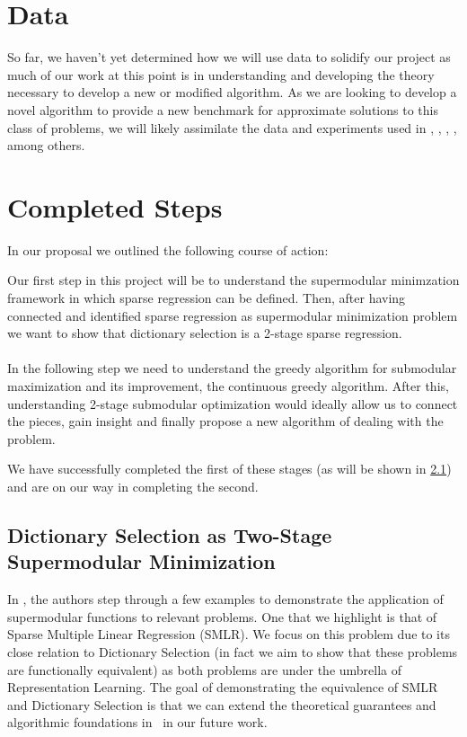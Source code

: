 \documentclass{article}
\begin{document}
\section{Data}
So far, we haven't yet determined how we will use data to solidify our project as much of our work at this point is in understanding and developing the theory necessary to develop a new or modified algorithm. As we are looking to develop a novel algorithm to provide a new benchmark for approximate solutions to this class of problems, we will likely assimilate the data and experiments used in  \cite{submod_spectral}, \cite{greedy_selection}, \cite{rIBP}, \cite{Singer16TwoStage}, among others. 


\section{Completed Steps}

In our proposal we outlined the following course of action:
\begin{displayquote}
Our first step in this project will be to understand the supermodular minimzation framework in which sparse regression can be defined. Then, after having connected and identified sparse regression as supermodular minimization problem we want to show that dictionary selection is a 2-stage sparse regression. \\
\\
In the following step we need to understand the greedy algorithm for submodular maximization and its improvement, the continuous greedy algorithm. After this, understanding 2-stage submodular optimization would ideally allow us to connect the pieces, gain insight and finally propose a new algorithm of dealing with the problem.
\end{displayquote}

We have successfully completed the first of these stages (as will be shown in \ref{supermodTwoStage}) and are on our way in completing the second.

\subsection{Dictionary Selection as Two-Stage Supermodular Minimization} \label{supermodTwoStage}

In \cite{BoutsidisLS15}, the authors step through a few examples to demonstrate the application of supermodular functions to relevant problems. One that we highlight is that of Sparse Multiple Linear Regression (SMLR). We focus on this problem due to its close relation to Dictionary Selection (in fact we aim to show that these problems are functionally equivalent) as both problems are under the umbrella of Representation Learning. The goal of demonstrating the equivalence of SMLR and Dictionary Selection is that we can extend the theoretical guarantees and algorithmic foundations in~\cite{BoutsidisLS15} in our future work. 
\\
\end{document}
